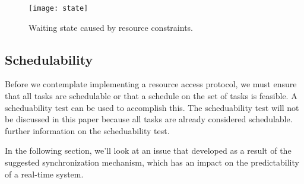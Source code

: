 \begin{figure}[ht]
    \centering
    \texttt{[image: state]}
    \caption{Waiting state caused by resource constraints. \cite{b5}}
    \label{fig:state}
\end{figure}



\subsection{Schedulability}

Before we contemplate implementing a resource access protocol, we must ensure that all tasks are schedulable or that a schedule on the set of tasks is feasible. A scheduability test can be used to accomplish this. The scheduability test will not be discussed in this paper because all tasks are already considered schedulable. \cite{b5} further information on the scheduability test.

In the following section, we'll look at an issue that developed as a result of the suggested synchronization mechanism, which has an impact on the predictability of a real-time system.